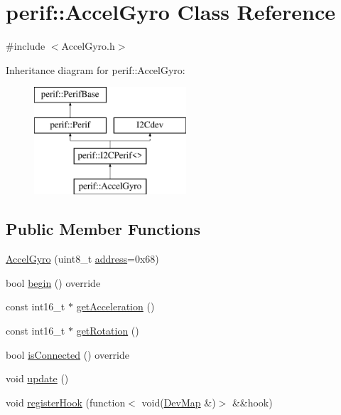\hypertarget{classperif_1_1AccelGyro}{}\section{perif\+::Accel\+Gyro Class Reference}
\label{classperif_1_1AccelGyro}


{\ttfamily \#include $<$Accel\+Gyro.\+h$>$}

Inheritance diagram for perif\+::Accel\+Gyro\+:\begin{figure}[H]
\begin{center}
\leavevmode
\includegraphics[height=4.000000cm]{classperif_1_1AccelGyro}
\end{center}
\end{figure}
\subsection*{Public Member Functions}
\begin{DoxyCompactItemize}
\item 
\mbox{\hyperlink{classperif_1_1AccelGyro_abb2b2920505708a2108e95fa4d6fd433}{Accel\+Gyro}} (uint8\+\_\+t \mbox{\hyperlink{classperif_1_1I2CPerif_a3275bcc89b3d8ddfa221fb76669c2d45}{address}}=0x68)
\item 
bool \mbox{\hyperlink{classperif_1_1AccelGyro_aebbf13d39d889c298103f16a02b4cce4}{begin}} () override
\item 
const int16\+\_\+t $\ast$ \mbox{\hyperlink{classperif_1_1AccelGyro_a383ef99745838084b620c2e0bfd8d129}{get\+Acceleration}} ()
\item 
const int16\+\_\+t $\ast$ \mbox{\hyperlink{classperif_1_1AccelGyro_a494e07c2792ac25b013d05ddb3d89234}{get\+Rotation}} ()
\item 
bool \mbox{\hyperlink{classperif_1_1I2CPerif_aa8741297b2f5f9a0242806afa26b7361}{is\+Connected}} () override
\item 
void \mbox{\hyperlink{classperif_1_1Perif_ad6fe1a13354bba4af4cc2751399ed93c}{update}} ()
\item 
void \mbox{\hyperlink{classperif_1_1PerifBase_a2e8bcc221ee253b21b61c7c07307d931}{register\+Hook}} (function$<$ void(\mbox{\hyperlink{Perif_8hpp_a358ff4ee6d24694ee7661f0cce14377e}{Dev\+Map}} \&)$>$ \&\&hook)
\end{DoxyCompactItemize}
